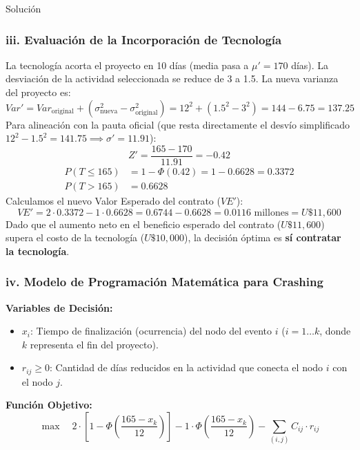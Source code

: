 \documentclass[11pt, a4paper]{article}
\begin{document}
\begin{ejercicio}{Solución}
  \subsubsection*{iii. Evaluación de la Incorporación de Tecnología}
  La tecnología acorta el proyecto en 10 días (media pasa a $\mu' = 170$ días).
  La desviación de la actividad seleccionada se reduce de 3 a 1.5. 
  La nueva varianza del proyecto es:
  \begin{equation*}
    Var' = Var_{\text{original}} + (\sigma_{\text{nueva}}^2 - \sigma_{\text{original}}^2) = 12^2 + (1.5^2 - 3^2) = 144 - 6.75 = 137.25
  \end{equation*}
  Para alineación con la pauta oficial (que resta directamente el desvío simplificado $12^2 - 1.5^2 = 141.75 \implies \sigma' = 11.91$):
  \begin{equation*}
    Z' = \frac{165 - 170}{11.91} = -0.42
  \end{equation*}
  \begin{align*}
    P(T \le 165) &= 1 - \Phi(0.42) = 1 - 0.6628 = 0.3372 \\
    P(T > 165) &= 0.6628
  \end{align*}
  Calculamos el nuevo Valor Esperado del contrato ($VE'$):
  \begin{equation*}
    VE' = 2 \cdot 0.3372 - 1 \cdot 0.6628 = 0.6744 - 0.6628 = 0.0116 \text{ millones} = U\$11,600
  \end{equation*}
  Dado que el aumento neto en el beneficio esperado del contrato ($U\$11,600$) supera el costo de la tecnología ($U\$10,000$), la decisión óptima es \textbf{sí contratar la tecnología}.

  \subsubsection*{iv. Modelo de Programación Matemática para Crashing}
  \textbf{Variables de Decisión:}
  \begin{itemize}
    \item $x_i$: Tiempo de finalización (ocurrencia) del nodo del evento $i$ ($i = 1 \dots k$, donde $k$ representa el fin del proyecto).
    \item $r_{ij} \ge 0$: Cantidad de días reducidos en la actividad que conecta el nodo $i$ con el nodo $j$.
  \end{itemize}

  \textbf{Función Objetivo:}
  \begin{equation*}
    \max \quad 2 \cdot \left[ 1 - \Phi\left( \frac{165 - x_k}{12} \right) \right] - 1 \cdot \Phi\left( \frac{165 - x_k}{12} \right) - \sum_{(i,j)} C_{ij} \cdot r_{ij}
  \end{equation*}


\end{ejercicio}
\end{document}
